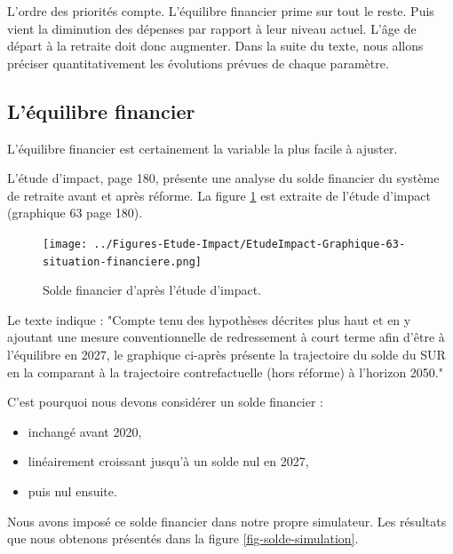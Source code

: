 \documentclass[10pt]{article}
\begin{document}
L'ordre des priorités compte. 
L'équilibre financier prime sur tout le reste. 
Puis vient la diminution des dépenses par rapport à leur niveau actuel. 
L'âge de départ à la retraite doit donc augmenter. 
Dans la suite du texte, nous allons préciser quantitativement 
les évolutions prévues de chaque paramètre. 


\subsection{L'équilibre financier}

L'équilibre financier est certainement la variable 
la plus facile à ajuster. 

L'étude d'impact, page 180, présente une analyse du solde financier du système de retraite 
avant et après réforme.
La figure \ref{fig-solde-etude-impact} est extraite de l'étude d'impact 
(graphique 63 page 180). 

\begin{figure}
\begin{center}
\texttt{[image: ../Figures-Etude-Impact/EtudeImpact-Graphique-63-situation-financiere.png]}
\end{center}
\caption{Solde financier d'après l'étude d'impact.}
\label{fig-solde-etude-impact}
\end{figure}

Le texte indique : "Compte tenu des hypothèses décrites plus haut 
et en y ajoutant une mesure conventionnelle de redressement à court 
terme afin d’être à l’équilibre en 2027, le graphique ci-après présente 
la trajectoire du solde du SUR en la comparant à la trajectoire 
contrefactuelle (hors réforme) à l’horizon 2050."

C'est pourquoi nous devons considérer un solde financier :
\begin{itemize}
\item inchangé avant 2020,
\item linéairement croissant jusqu'à un solde nul en 2027,
\item puis nul ensuite.
\end{itemize}

Nous avons imposé ce solde financier dans notre propre simulateur. 
Les résultats que nous obtenons présentés dans la figure \ref{fig-solde-simulation}. 
\end{document}
